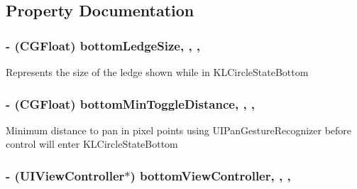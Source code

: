 \subsection{Property Documentation}
\hypertarget{interface_k_l_circle_view_controller_a0b1ab24cc903aa300593eea290726347}{
\subsubsection[{bottom\-Ledge\-Size}]{\setlength{\rightskip}{0pt plus 5cm}-\/ (C\-G\-Float) bottom\-Ledge\-Size\hspace{0.3cm}{\ttfamily [read]}, {\ttfamily [write]}, {\ttfamily [nonatomic]}, {\ttfamily [assign]}}}\label{interface_k_l_circle_view_controller_a0b1ab24cc903aa300593eea290726347}
Represents the size of the ledge shown while in K\-L\-Circle\-State\-Bottom \hypertarget{interface_k_l_circle_view_controller_a6511b48e6e57adba02cf10977a300049}{
\subsubsection[{bottom\-Min\-Toggle\-Distance}]{\setlength{\rightskip}{0pt plus 5cm}-\/ (C\-G\-Float) bottom\-Min\-Toggle\-Distance\hspace{0.3cm}{\ttfamily [read]}, {\ttfamily [write]}, {\ttfamily [nonatomic]}, {\ttfamily [assign]}}}\label{interface_k_l_circle_view_controller_a6511b48e6e57adba02cf10977a300049}
Minimum distance to pan in pixel points using U\-I\-Pan\-Gesture\-Recognizer before control will enter K\-L\-Circle\-State\-Bottom \hypertarget{interface_k_l_circle_view_controller_a5b38b48e4771aff4fedbc45d25c3e14a}{
\subsubsection[{bottom\-View\-Controller}]{\setlength{\rightskip}{0pt plus 5cm}-\/ (U\-I\-View\-Controller$\ast$) bottom\-View\-Controller\hspace{0.3cm}{\ttfamily [read]}, {\ttfamily [write]}, {\ttfamily [nonatomic]}, {\ttfamily [strong]}}}\label{interface_k_l_circle_view_controller_a5b38b48e4771aff4fedbc45d25c3e14a}
